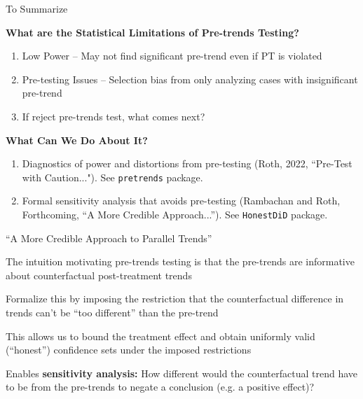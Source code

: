 \documentclass[aspectratio = 169, 13pt]{beamer}
\begin{document}
\begin{frame}{To Summarize}
	
	\textbf{What are the Statistical Limitations of Pre-trends Testing?}
	\begin{enumerate}
		\item
		      Low Power -- May not find significant pre-trend even if PT is violated
		          
		\item
		      Pre-testing Issues -- Selection bias from only analyzing cases with insignificant pre-trend
		          
		\item
		      If reject pre-trends test, what comes next? 
	\end{enumerate}
	
	\bigskip
	\pause 
	
	\textbf{What Can We Do About It?}
	\begin{enumerate}
		\item 
		      Diagnostics of power and distortions from pre-testing (Roth, 2022, ``Pre-Test with Caution..."). See \texttt{pretrends} package. \hyperlink{power_analysis}{}
		          
		\item
		      Formal sensitivity analysis that avoids pre-testing (Rambachan and Roth, Forthcoming, ``A More Credible Approach...''). See \texttt{HonestDiD} package.
		          
	\end{enumerate}
	
\end{frame}




\begin{frame}{``A More Credible Approach to Parallel Trends''}
	\begin{wideitemize}
		
		
		\item The intuition motivating pre-trends testing is that the pre-trends are informative about counterfactual post-treatment trends
		
		\item Formalize this by imposing the restriction that the counterfactual difference in trends can't be ``too different'' than the pre-trend
		
		
		\item This allows us to bound the treatment effect and obtain uniformly valid (``honest'') confidence sets under the imposed restrictions
		    
		    
		\item Enables \textbf{sensitivity analysis:} How different would the counterfactual trend have to be from the pre-trends to negate a conclusion (e.g. a positive effect)?
		    
	\end{wideitemize}
	
\end{frame}
\end{document}
